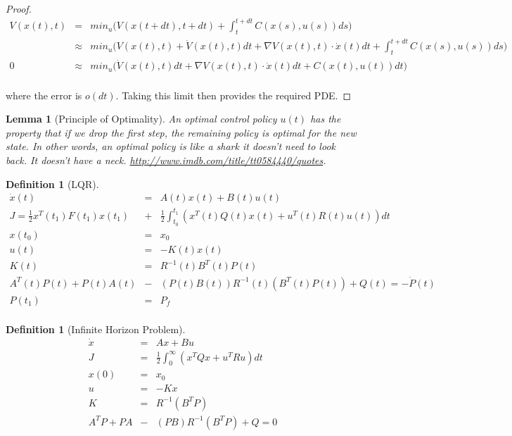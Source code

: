 \documentclass[a4paper,landscape]{article}
\theoremstyle{change}
\newtheorem{definition}[equation]{Definition}
\newtheorem{lemma}[equation]{Lemma}
\theoremstyle{nonumberplain}
\newtheorem{proof}{Proof}
\numberwithin{equation}{section}
\begin{document}
\begin{proof}
\begin{eqnarray*}
V(x(t),t) &=& min_u  \big( V(x(t+dt),t+dt) + \int_t^{t+dt} C(x(s),u(s)) ds \big)\\
&\approx& min_u  \big( V(x(t),t) + \dot{V}(x(t),t) dt + \nabla V ( x(t) , t) \cdot \dot{x}(t) dt + \int_t^{t+dt} C(x(s),u(s)) ds \big)\\
0 &\approx& min_u  \big( \dot{V}(x(t),t) dt + \nabla V ( x(t) , t) \cdot \dot{x}(t) dt + C(x(t),u(t)) dt \big)\\
\end{eqnarray*}

where the error is $o(dt)$. Taking this limit then provides the required PDE.

\end{proof}

\begin{lemma}[Principle of Optimality]
An optimal control policy $u(t)$ has the property that if we drop the first step, the remaining policy is optimal for the new state. In other words, an optimal policy is like a shark it doesn't need to look back. It doesn't have a neck. \url{http://www.imdb.com/title/tt0584440/quotes}.
\end{lemma}

\begin{definition}[LQR]
\begin{eqnarray*}
\dot{x}(t) &=& A (t) x(t) + B(t) u(t)\\
J = \frac{1}{2} x^T (t_1) F(t_1 ) x (t_1) &+& \frac{1}{2} \int_{t_0}^{t_1} ( x^T (t) Q (t) x (t) + u^T (t) R(t) u(t)  ) dt\\
x (t_0 ) &=& x_0\\
u(t) &=& - K(t) x(t)\\
K(t) &=& R^{-1}(t) B^T(t) P (t)\\
A^T (t) P(t) + P(t) A(t) &-& ( P(t) B(t) ) R^{-1}(t) ( B^T(t) P(t) ) + Q(t) = - \dot{P} (t)\\
P(t_1 ) &=& P_f\\
\end{eqnarray*}
\end{definition}

\begin{definition}[Infinite Horizon Problem]
\begin{eqnarray*}
\dot{x} &=& Ax + Bu\\
J &=& \frac{1}{2} \int_{0}^{\infty} ( x^T Q x + u^T R u  ) dt\\
x (0 ) &=& x_0\\
u &=& - K x\\
K &=& R^{-1} ( B^T P  )\\
A^T P + P A &-& ( P B ) R^{-1} ( B^T P ) + Q = 0\\
\end{eqnarray*}
\end{definition}
\end{document}
